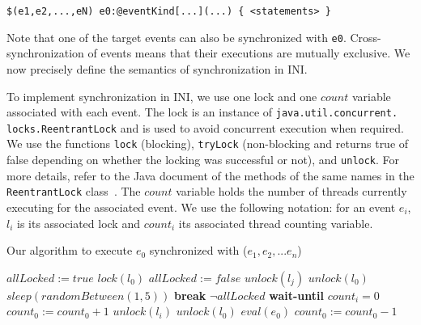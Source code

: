 \documentclass[runningheads,a4paper]{llncs}
\begin{document}
\begin{lstlisting}[numbers=none]
$(e1,e2,...,eN) e0:@eventKind[...](...) { <statements> }
\end{lstlisting}

Note that one of the target events can also be synchronized with \texttt{e0}. Cross-synchroni\-zation of events means that their executions are mutually exclusive. We now precisely define the semantics of synchronization in INI.

To implement synchronization in INI, we use one lock and one $count$ variable associated with each event. The lock is an instance of \texttt{java.util.concurrent. locks.ReentrantLock} and is used to avoid concurrent execution when required. We use the functions \texttt{lock} (blocking),  \texttt{tryLock} (non-blocking and returns true of false depending on whether the locking was successful or not), and  \texttt{unlock}. For more details, refer to the Java document of the methods of the same names in the \texttt{ReentrantLock} class~\cite{Java6Doc}. The $count$ variable holds the number of threads currently executing for the associated event. We use the following notation: for an event \begin{math} e_i \end{math}, \begin{math} l_{i} \end{math} is its associated lock and \begin{math} count_i \end{math} its associated thread counting variable.

\begin{algorithm}[h!]
\caption{Our algorithm to execute $e_0$ synchronized with ($e_1, e_2, ... e_n$)}
\begin{algorithmic}[1]
\REPEAT
\STATE $allLocked := true$
\STATE $lock(l_{0})$
\STATE $allLocked := false$
\STATE $unlock(l_{j})$
\ENDFOR
\STATE $unlock(l_{0})$
\STATE $sleep(randomBetween(1,5))$
\STATE \textbf{break}
\ENDIF
\ENDFOR
\UNTIL $\neg allLocked$
\STATE \textbf{wait-until} $count_{i}=0$
\ENDFOR
\STATE $count_{0} := count_{0}+1$
\STATE $unlock(l_{i})$
\ENDFOR
\STATE $unlock(l_{0})$
\STATE $eval(e_{0})$
\STATE $count_{0} := count_{0}-1$
\end{algorithmic}
\end{algorithm}
\end{document}
